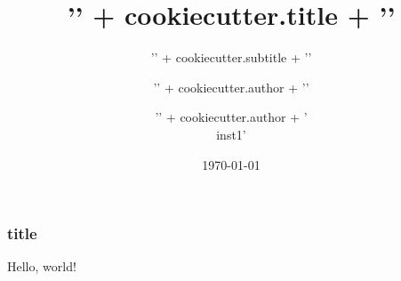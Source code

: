 \documentclass[10pt]{beamer}
\date{\today}
\title{{'{' + cookiecutter.title + '}'}}
\subtitle{{'{' + cookiecutter.subtitle + '}'}}
\author{{'{' + cookiecutter.author + '}'}}
\institute{{'{' + cookiecutter.affiliation + '}'}}
\author[shortname]{{'{' + cookiecutter.author + '\\inst{1}}'}}
\institute[shortinst]{
\inst{1}{{'{' + cookiecutter.affiliation + '}' }}
}
\begin{document}
\maketitle

%

\begin{frame}[c]
  \frametitle{title}

  Hello, world!
\end{frame}


% 
\end{document}
